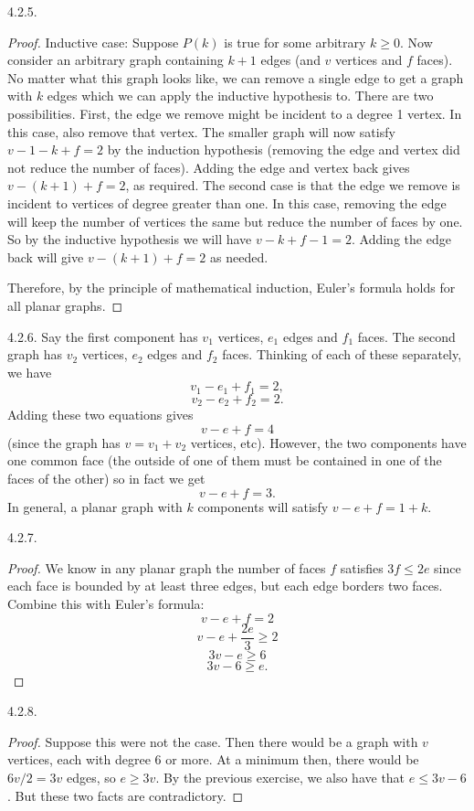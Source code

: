 \begin {itemize}
\begin{ans}{4.2.5.}
\begin{proof}
			Inductive case:  Suppose $P(k)$ is true for some arbitrary $k \ge 0$.  Now consider an arbitrary graph containing $k+1$ edges (and $v$ vertices and $f$ faces).  No matter what this graph looks like, we can remove a single edge to get a graph with $k$ edges which we can apply the inductive hypothesis to.  There are two possibilities.  First, the edge we remove might be incident to a degree 1 vertex.  In this case, also remove that vertex.  The smaller graph will now satisfy $v-1 - k + f = 2$ by the induction hypothesis (removing the edge and vertex did not reduce the number of faces).  Adding the edge and vertex back gives $v - (k+1) + f = 2$, as required.  The second case is that the edge we remove is incident to vertices of degree greater than one.  In this case, removing the edge will keep the number of vertices the same but reduce the number of faces by one.  So by the inductive hypothesis we will have $v - k + f-1 = 2$.  Adding the edge back will give $v - (k+1) + f = 2$ as needed.

			Therefore, by the principle of mathematical induction, Euler's formula holds for all planar graphs.
		\end{proof}
	
\end{ans}
\begin{ans}{4.2.6.}
		Say the first component has $v_1$ vertices, $e_1$ edges and $f_1$ faces.  The second graph has $v_2$ vertices, $e_2$ edges and $f_2$ faces.  Thinking of each of these separately, we have
		\[v_1 - e_1 + f_1 = 2,\]
		\[v_2 - e_2 + f_2 = 2.\]
		Adding these two equations gives
		\[v - e + f = 4\]
		(since the graph has $v = v_1 + v_2$ vertices, etc).  However, the two components have one common face (the outside of one of them must be contained in one of the faces of the other) so in fact we get
		\[v - e + f = 3.\]
		In general, a planar graph with $k$ components will satisfy $v - e + f = 1 + k$.
	
\end{ans}
\begin{ans}{4.2.7.}
		\begin{proof}
		We know in any planar graph the number of faces $f$ satisfies $3f \le 2e$ since each face is bounded by at least three edges, but each edge borders two faces.  Combine this with Euler's formula:
				\[v - e + f = 2\]
				\[v - e + \frac{2e}{3} \ge 2\]
				\[3v - e \ge 6\]
				\[3v - 6 \ge e.\]
		\end{proof}

	
\end{ans}
\begin{ans}{4.2.8.}
		\begin{proof}
		 Suppose this were not the case.  Then there would be a graph with $v$ vertices, each with degree 6 or more.  At a minimum then, there would be $6v/2 = 3v$ edges, so $e \ge 3v$.  By the previous exercise, we also have that $e \le 3v - 6$.  But these two facts are contradictory.
		 \end{proof}
	
\end{ans}
\protect \end {itemize}
